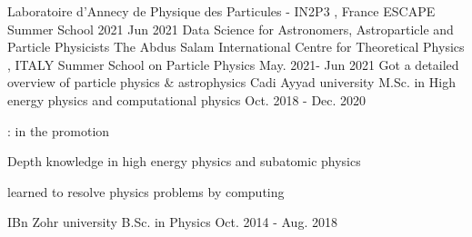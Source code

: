

\begin{cventries}
           \cventry
    {Laboratoire d'Annecy de Physique des Particules - IN2P3 , France} %
        {ESCAPE Summer School 2021 } %
    {} %
    { Jun 2021} %
    {Data Science for Astronomers, Astroparticle and Particle Physicists}
           \cventry
    {The Abdus Salam International Centre for Theoretical Physics , ITALY} %
        {Summer School on Particle Physics} %
    {} %
    {May. 2021- Jun 2021} %
    {Got a detailed overview of particle physics \& astrophysics }
  \cventry
    {Cadi Ayyad university} 
     {M.Sc. in High energy physics and computational physics }%
    {} %
    {Oct. 2018 - Dec. 2020} %
    {
      \begin{cvitems} %
       \item {:  in the promotion}
        \item {Depth knowledge in high energy physics and subatomic physics}
        \item {learned  to resolve physics problems by computing }
      \end{cvitems}
    }
      \cventry
    {IBn Zohr university} %
        {B.Sc. in Physics} %
    {} %
    {Oct. 2014 - Aug. 2018} %
    {}
\end{cventries}
